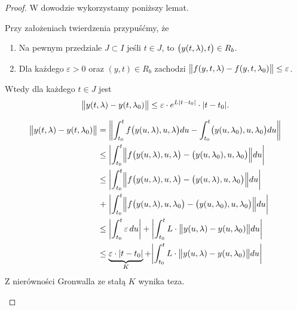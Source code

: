 \begin{proof}
  W dowodzie wykorzystamy poniższy lemat.
  
  \begin{lemma} \label{L: Kluczowy}
    Przy założeniach twierdzenia przypuśćmy, że
    \begin{enumerate}
      \item Na pewnym przedziale $J \subset I$ jeśli $t \in J$, to 
      $\p[\big]{y(t,\lambda),t} \in R_b$.
      \item Dla każdego $\varepsilon > 0$ oraz $(y,t) \in R_b$ zachodzi
      $ \norm[\big]{ f(y,t,\lambda) - f(y,t,\lambda_0) } \leq \varepsilon $.
    \end{enumerate}
    Wtedy dla każdego $t \in J$ jest
    \[
      \norm[\big]{ y(t,\lambda) - y(t,\lambda_0) } \leq
      \varepsilon \cdot e^{L \abs{t-t_0}} \cdot \abs{t-t_0}.
    \]
  \end{lemma}

  \begin{innerproof}
    \begin{align*}
      \norm[\big]{ y(t,\lambda) - y(t,\lambda_0) }
      &= \norm*{ \int_{t_0}^t f \p[\big]{ y(u,\lambda), u, \lambda } du - 
      \int_{t_0}^t \p[\big]{ y(u,\lambda_0), u, \lambda_0 } du} \\
      &\leq \abs*{ \int_{t_0}^t \norm[\Big]{ f \p[\big]{ y(u,\lambda), u, 
      \lambda } - \p[\big]{ y(u,\lambda_0), u, \lambda_0 } } du } \\
      &\leq \abs*{ \int_{t_0}^t \norm[\Big]{ f \p[\big]{ y(u,\lambda), u, 
      \lambda } - \p[\big]{ y(u,\lambda), u, \lambda_0 } } du } \\
      &\mathrel{\makebox[\widthof{=}]{+}} \abs*{ \int_{t_0}^t \norm[\Big]{ f 
      \p[\big]{ y(u,\lambda), u, \lambda_0 } - \p[\big]{ y(u,\lambda_0), u, 
      \lambda_0 } } du } \\
      &\leq \abs*{\int_{t_0}^t \varepsilon \, du} + \abs*{ \int_{t_0}^t L \cdot 
      \norm[\big]{ y(u,\lambda) - y(u,\lambda_0) } du } \\
      &\leq \underbrace{\varepsilon \cdot \abs*{t-t_0}}_K + \abs*{ \int_{t_0}^t 
      L \cdot \norm[\big]{ y(u,\lambda) - y(u,\lambda_0) } du }
    \end{align*}
    Z nierówności Gronwalla ze stałą $K$ wynika teza.
  \end{innerproof}


\end{proof}
